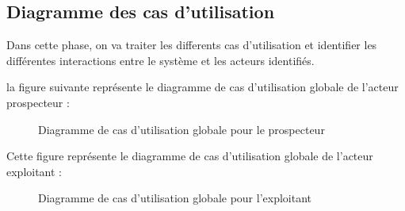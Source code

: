 \subsection{Diagramme des cas d'utilisation}
 Dans cette phase, on va traiter les differents cas d'utilisation et identifier les diff\'erentes interactions entre le syst\`eme et les acteurs identifi\'es.
 
la figure suivante repr\'esente le diagramme de cas d'utilisation globale de l'acteur prospecteur :
\begin{figure}[H]
	\caption{\label{fig:my-label} Diagramme de cas d'utilisation globale pour le prospecteur}
\end{figure}

Cette figure repr\'esente le diagramme de cas d'utilisation globale de l'acteur exploitant :
\begin{figure}[H]
	\caption{\label{fig:my-label} Diagramme de cas d'utilisation globale pour l'exploitant}
\end{figure}


